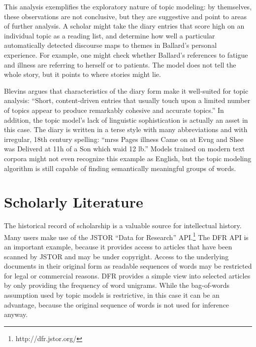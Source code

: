 This analysis exemplifies the exploratory nature of topic modeling: by themselves, these observations are not conclusive, but they are suggestive and point to areas of further analysis.
A scholar might take the diary entries that score high on an individual topic as a reading list, and determine how well a particular automatically detected discourse maps to themes in Ballard's personal experience.
For example, one might check whether Ballard's references to fatigue and illness are referring to herself or to patients.
The model does not tell the whole story, but it points to where stories might lie.

Blevins argues that characteristics of the diary form make it well-suited for topic analysis: ``Short, content-driven entries that usually touch upon a limited number of topics appear to produce remarkably cohesive and accurate topics.''
In addition, the topic model's lack of linguistic sophistication is actually an asset in this case.
The diary is written in a terse style with many abbreviations and with irregular, 18th century spelling: ``mrss Pages illness Came on at Evng and Shee was Deliverd at 11h of a Son which waid 12 lb.''
Models trained on modern text corpora might not even recognize this example as English, but the topic modeling algorithm is still capable of finding semantically meaningful groups of words.



\section{Scholarly Literature}



The historical record of scholarship is a valuable source for intellectual history.
Many users make use of the JSTOR ``Data for Research'' API.\footnote{http://dfr.jstor.org/}
The DFR API is an important example, because it provides access to articles that have been scanned by JSTOR and may be under copyright.
Access to the underlying documents in their original form as readable sequences of words may be restricted for legal or commercial reasons.
DFR provides a simple view into selected articles by only providing the frequency of word unigrams.
While the bag-of-words assumption used by topic models is restrictive, in this case it can be an advantage, because the original sequence of words is not used for inference anyway.

